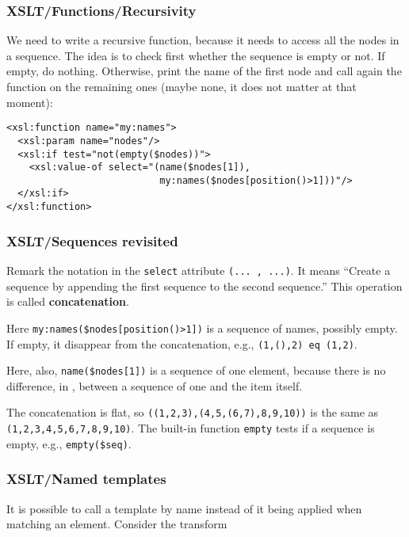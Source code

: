 %
\begin{frame}[containsverbatim]
\frametitle{XSLT/Functions/Recursivity}

We need to write a recursive function, because it needs to access all
the nodes in a sequence. The idea is to check first whether the
sequence is empty or not. If empty, do nothing. Otherwise, print the
name of the first node and call again the function on the remaining
ones (maybe none, it does not matter at that moment):
{\small
\begin{verbatim}
<xsl:function name="my:names">
  <xsl:param name="nodes"/>
  <xsl:if test="not(empty($nodes))">
    <xsl:value-of select="(name($nodes[1]),
                           my:names($nodes[position()>1]))"/>
  </xsl:if>
</xsl:function>
\end{verbatim}
}

\end{frame}

%
\begin{frame}[containsverbatim]
\frametitle{XSLT/Sequences revisited}

Remark the notation in the \texttt{select} attribute
\verb|(... , ...)|. It means ``Create a sequence by appending the
first sequence to the second sequence.'' This operation is called
\textbf{concatenation}.

\bigskip

Here \verb|my:names($nodes[position()>1])| is a sequence of names,
possibly empty. If empty, it disappear from the concatenation, e.g.,
\verb|(1,(),2) eq (1,2)|. 

\bigskip

Here, also, \verb|name($nodes[1])| is a sequence of one element,
because there is no difference, in \XSLT, between a sequence of one
and the item itself.

\bigskip

The concatenation is flat, so \verb|((1,2,3),(4,5,(6,7),8,9,10))| is
the same as \verb|(1,2,3,4,5,6,7,8,9,10)|. The built-in function
\texttt{empty} tests if a sequence is empty, e.g., \verb|empty($seq)|.

\end{frame}

%
\begin{frame}
\frametitle{XSLT/Named templates}
 
It is possible to call a template by name instead of it being applied
when matching an element.
Consider the transform

\end{frame}

